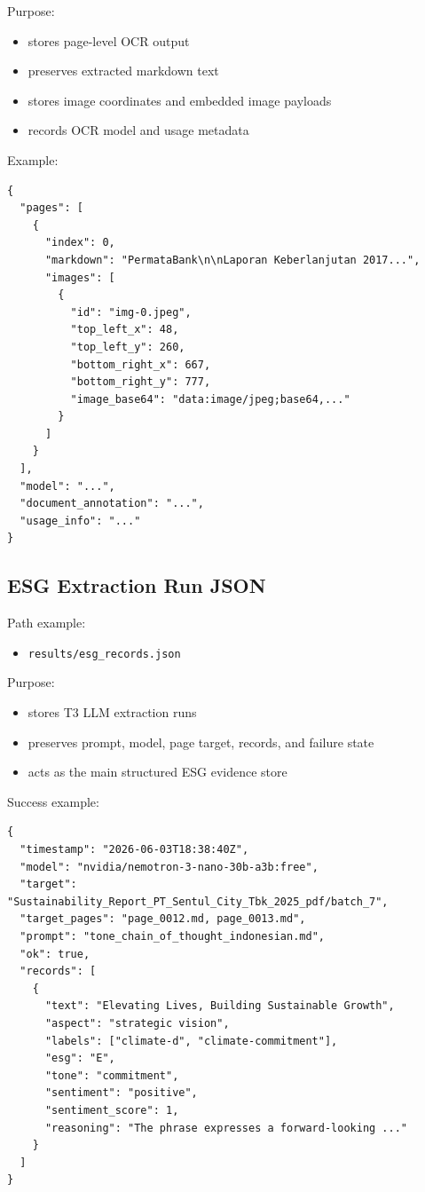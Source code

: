 \documentclass[english, online, cse, master]{dithesis}
\providecommand{\tightlist}{\setlength{\itemsep}{0pt}\setlength{\parskip}{0pt}}
\begin{document}
Purpose:

\begin{itemize}
\tightlist
\item
  stores page-level OCR output
\item
  preserves extracted markdown text
\item
  stores image coordinates and embedded image payloads
\item
  records OCR model and usage metadata
\end{itemize}

Example:

\begin{verbatim}
{
  "pages": [
    {
      "index": 0,
      "markdown": "PermataBank\n\nLaporan Keberlanjutan 2017...",
      "images": [
        {
          "id": "img-0.jpeg",
          "top_left_x": 48,
          "top_left_y": 260,
          "bottom_right_x": 667,
          "bottom_right_y": 777,
          "image_base64": "data:image/jpeg;base64,..."
        }
      ]
    }
  ],
  "model": "...",
  "document_annotation": "...",
  "usage_info": "..."
}
\end{verbatim}

\subsection{ESG Extraction Run JSON}\label{esg-extraction-run-json}

Path example:

\begin{itemize}
\tightlist
\item
  \texttt{results/esg\_records.json}
\end{itemize}

Purpose:

\begin{itemize}
\tightlist
\item
  stores T3 LLM extraction runs
\item
  preserves prompt, model, page target, records, and failure state
\item
  acts as the main structured ESG evidence store
\end{itemize}

Success example:

\begin{verbatim}
{
  "timestamp": "2026-06-03T18:38:40Z",
  "model": "nvidia/nemotron-3-nano-30b-a3b:free",
  "target": "Sustainability_Report_PT_Sentul_City_Tbk_2025_pdf/batch_7",
  "target_pages": "page_0012.md, page_0013.md",
  "prompt": "tone_chain_of_thought_indonesian.md",
  "ok": true,
  "records": [
    {
      "text": "Elevating Lives, Building Sustainable Growth",
      "aspect": "strategic vision",
      "labels": ["climate-d", "climate-commitment"],
      "esg": "E",
      "tone": "commitment",
      "sentiment": "positive",
      "sentiment_score": 1,
      "reasoning": "The phrase expresses a forward-looking ..."
    }
  ]
}
\end{verbatim}
\end{document}
